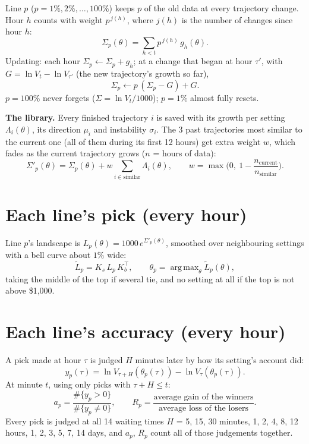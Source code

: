 \documentclass[11pt]{article}
\DeclareMathOperator*{\argmax}{arg\,max}
\begin{document}
Line $p$ ($p = 1\%, 2\%, \dots, 100\%$) keeps $p$ of the old data at every trajectory change.
Hour $h$ counts with weight $p^{\,j(h)}$, where $j(h)$ is the number of changes since hour $h$:
\[
\Sigma_p(\theta) = \sum_{h<t} p^{\,j(h)}\,g_h(\theta).
\]
Updating: each hour $\Sigma_p \leftarrow \Sigma_p + g_h$; at a change that began at hour $\tau'$,
with $G = \ln V_t - \ln V_{\tau'}$ (the new trajectory's growth so far),
\[
\Sigma_p \leftarrow p\,(\Sigma_p - G) + G .
\]
$p = 100\%$ never forgets ($\Sigma = \ln V_t/1000$); $p = 1\%$ almost fully resets.

\textbf{The library.} Every finished trajectory $i$ is saved with its growth per setting
$\Lambda_i(\theta)$, its direction $\mu_i$ and instability $\sigma_i$. The 3 past trajectories most
similar to the current one (all of them during its first 12 hours) get extra weight $w$, which fades
as the current trajectory grows ($n$ = hours of data):
\[
\Sigma'_p(\theta) = \Sigma_p(\theta) + w \sum_{i \in \text{similar}} \Lambda_i(\theta),
\qquad w = \max\!\Big(0,\ 1 - \frac{n_{\text{current}}}{n_{\text{similar}}}\Big).
\]

\section{Each line's pick (every hour)}

Line $p$'s landscape is $L_p(\theta) = 1000\,e^{\Sigma'_p(\theta)}$, smoothed over neighbouring settings
with a bell curve about $1\%$ wide:
\[
\widetilde L_p = K_s\, L_p\, K_b^{\top},\qquad
\theta_p = \argmax_\theta \widetilde L_p(\theta),
\]
taking the middle of the top if several tie, and no setting at all if the top is not above \$1{,}000.

\section{Each line's accuracy (every hour)}

A pick made at hour $\tau$ is judged $H$ minutes later by how its setting's account did:
\[
y_p(\tau) = \ln V_{\tau+H}(\theta_p(\tau)) - \ln V_{\tau}(\theta_p(\tau)).
\]
At minute $t$, using only picks with $\tau + H \le t$:
\[
a_p = \frac{\#\{y_p > 0\}}{\#\{y_p \ne 0\}},\qquad
R_p = \frac{\text{average gain of the winners}}{\text{average loss of the losers}} .
\]
Every pick is judged at all 14 waiting times $H$ = 5, 15, 30 minutes, 1, 2, 4, 8, 12 hours,
1, 2, 3, 5, 7, 14 days, and $a_p$, $R_p$ count all of those judgements together.
\end{document}
